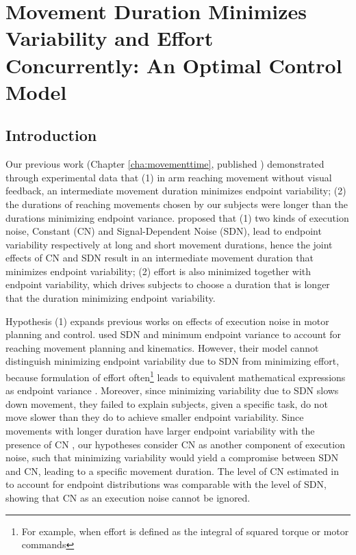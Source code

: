 \chapter{Movement Duration Minimizes Variability and Effort Concurrently: An Optimal Control Model}
\label{cha:optimalcontrol}

\section{Introduction}
Our previous work (Chapter \ref{cha:movementtime}, published \cite{Wang2016}) demonstrated through experimental data that 
(1) in arm reaching movement without visual feedback, an intermediate movement duration minimizes endpoint variability; 
(2) the durations of reaching movements chosen by our subjects were longer than the durations minimizing endpoint variance. 
\cite{Wang2016} proposed that 
(1) two kinds of execution noise, Constant (CN) and Signal-Dependent Noise (SDN), lead to endpoint variability respectively at long and short movement durations, hence the joint effects of CN and SDN result in an intermediate movement duration that minimizes endpoint variability;
(2) effort is also minimized together with endpoint variability, which drives subjects to choose a duration that is longer that the duration minimizing endpoint variability.

Hypothesis (1) expands previous works on effects of execution noise in motor planning and control.
\cite{Harris1998, Harris2006} used SDN and minimum endpoint variance to account for reaching movement planning and kinematics. 
However, their model cannot distinguish minimizing endpoint variability due to SDN from minimizing effort, because formulation of effort often\footnote{For example, when effort is defined as the integral of squared torque or motor commands} leads to equivalent mathematical expressions as endpoint variance \cite{Wang2016, OSullivan2009}. 
Moreover, since minimizing variability due to SDN slows down movement, they failed to explain subjects, given a specific task, do not move slower than they do to achieve smaller endpoint variability.
Since movements with longer duration have larger endpoint variability with the presence of CN \cite{Todorov2005}, our hypotheses consider CN as another component of execution noise, such that minimizing variability would yield a compromise between SDN and CN, leading to a specific movement duration. 
The level of CN estimated in \cite{VanBeers2004} to account for endpoint distributions was comparable with the level of SDN, showing that CN as an execution noise cannot be ignored.

